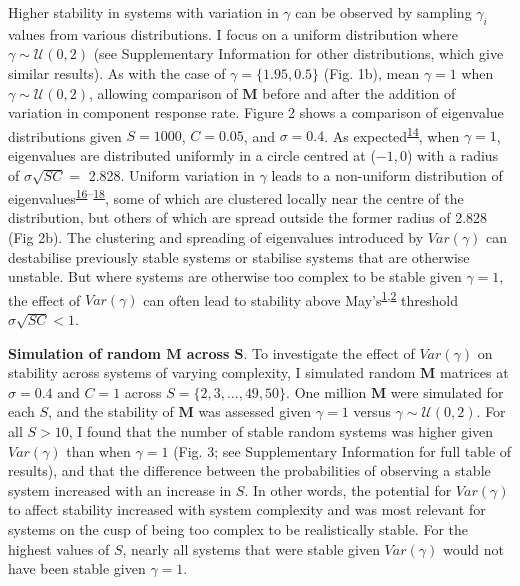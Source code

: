 \documentclass[]{article}
\begin{document}
Higher stability in systems with variation in \(\gamma\) can be observed
by sampling \(\gamma_{i}\) values from various distributions. I focus on
a uniform distribution where \(\gamma \sim \mathcal{U}(0, 2)\) (see
Supplementary Information for other distributions, which give similar
results). As with the case of \(\gamma = \{1.95, 0.5\}\) (Fig. 1b), mean
\(\gamma = 1\) when \(\gamma \sim \mathcal{U}(0, 2)\), allowing
comparison of \(\mathbf{M}\) before and after the addition of variation
in component response rate. Figure 2 shows a comparison of eigenvalue
distributions given \(S = 1000\), \(C = 0.05\), and \(\sigma = 0.4\). As
expected\textsuperscript{\protect\hyperlink{ref-Tao2010}{14}}, when
\(\gamma = 1\), eigenvalues are distributed uniformly in a circle
centred at (\(-1, 0\)) with a radius of \(\sigma\sqrt{SC} =\) 2.828.
Uniform variation in \(\gamma\) leads to a non-uniform distribution of
eigenvalues\textsuperscript{\protect\hyperlink{ref-Ahmadian2015}{16}--\protect\hyperlink{ref-Stone2017}{18}},
some of which are clustered locally near the centre of the distribution,
but others of which are spread outside the former radius of 2.828 (Fig
2b). The clustering and spreading of eigenvalues introduced by
\(Var(\gamma)\) can destabilise previously stable systems or stabilise
systems that are otherwise unstable. But where systems are otherwise too
complex to be stable given \(\gamma = 1\), the effect of \(Var(\gamma)\)
can often lead to stability above
May's\textsuperscript{\protect\hyperlink{ref-May1972}{1},\protect\hyperlink{ref-Allesina2012}{2}}
threshold \(\sigma\sqrt{SC} < 1\).


\textbf{Simulation of random \(\mathbf{M}\) across \(\mathbf{S}\)}. To
investigate the effect of \(Var(\gamma)\) on stability across systems of
varying complexity, I simulated random \(\mathbf{M}\) matrices at
\(\sigma = 0.4\) and \(C = 1\) across \(S = \{2, 3, ..., 49, 50\}\). One
million \(\mathbf{M}\) were simulated for each \(S\), and the stability
of \(\mathbf{M}\) was assessed given \(\gamma = 1\) versus
\(\gamma \sim \mathcal{U}(0, 2)\). For all \(S > 10\), I found that the
number of stable random systems was higher given \(Var(\gamma)\) than
when \(\gamma = 1\) (Fig. 3; see Supplementary Information for full
table of results), and that the difference between the probabilities of
observing a stable system increased with an increase in \(S\). In other
words, the potential for \(Var(\gamma)\) to affect stability increased
with system complexity and was most relevant for systems on the cusp of
being too complex to be realistically stable. For the highest values of
\(S\), nearly all systems that were stable given \(Var(\gamma)\) would
not have been stable given \(\gamma = 1\).
\end{document}
